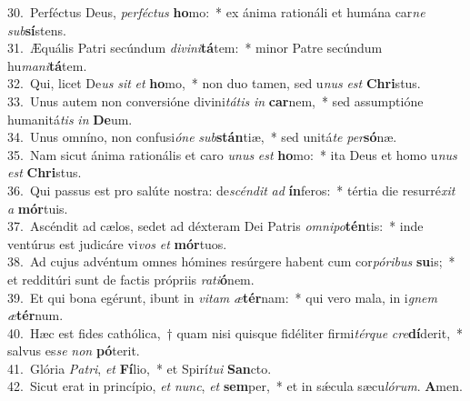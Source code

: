 {30.~}Perféctus Deus, \textit{per}\textit{fé}\textit{ctus} \textbf{ho}mo:~* ex ánima rationáli et humána car\textit{ne} \textit{sub}\textbf{sí}stens.\\
{31.~}Æquális Patri secúndum \textit{di}\textit{vi}\textit{ni}\textbf{tá}tem:~* minor Patre secúndum hu\textit{ma}\textit{ni}\textbf{tá}tem.\\
{32.~}Qui, licet De\textit{us} \textit{sit} \textit{et} \textbf{ho}mo,~* non duo tamen, sed u\textit{nus} \textit{est} \textbf{Chri}stus.\\
{33.~}Unus autem non conversióne divini\textit{tá}\textit{tis} \textit{in} \textbf{car}nem,~* sed assumptióne humanitá\textit{tis} \textit{in} \textbf{De}um.\\
{34.~}Unus omníno, non confusi\textit{ó}\textit{ne} \textit{sub}\textbf{stán}tiæ,~* sed unitá\textit{te} \textit{per}\textbf{só}næ.\\
{35.~}Nam sicut ánima rationális et caro \textit{u}\textit{nus} \textit{est} \textbf{ho}mo:~* ita Deus et homo u\textit{nus} \textit{est} \textbf{Chri}stus.\\
{36.~}Qui passus est pro salúte nostra: de\textit{scén}\textit{dit} \textit{ad} \textbf{ín}feros:~* tértia die resurré\textit{xit} \textit{a} \textbf{mór}tuis.\\
{37.~}Ascéndit ad cælos, sedet ad déxteram Dei Patris \textit{om}\textit{ni}\textit{po}\textbf{tén}tis:~* inde ventúrus est judicáre vi\textit{vos} \textit{et} \textbf{mór}tuos.\\
{38.~}Ad cujus advéntum omnes hómines resúrgere habent cum cor\textit{pó}\textit{ri}\textit{bus} \textbf{su}is;~* et redditúri sunt de factis própriis \textit{ra}\textit{ti}\textbf{ó}nem.\\
{39.~}Et qui bona egérunt, ibunt in \textit{vi}\textit{tam} \textit{æ}\textbf{tér}nam:~* qui vero mala, in i\textit{gnem} \textit{æ}\textbf{tér}num.\\
{40.~}Hæc est fides cathólica,~† quam nisi quisque fidéliter firmi\textit{tér}\textit{que} \textit{cre}\textbf{dí}derit,~* salvus es\textit{se} \textit{non} \textbf{pó}terit.\\
{41.~}Glória \textit{Pa}\textit{tri}, \textit{et} \textbf{Fí}lio,~* et Spirí\textit{tu}\textit{i} \textbf{San}cto.\\
{42.~}Sicut erat in princípio, \textit{et} \textit{nunc}, \textit{et} \textbf{sem}per,~* et in sǽcula sæcu\textit{ló}\textit{rum}. \textbf{A}men.\\

